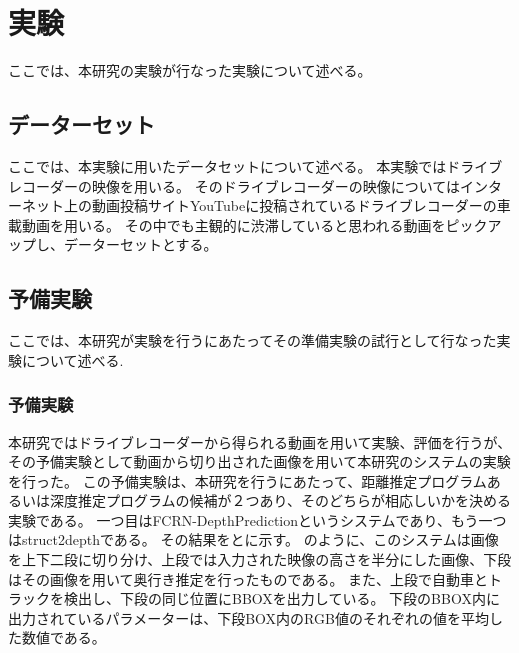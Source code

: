 \chapter{実験}
ここでは、本研究の実験が行なった実験について述べる。

\section{データーセット}
ここでは、本実験に用いたデータセットについて述べる。
本実験ではドライブレコーダーの映像を用いる。
そのドライブレコーダーの映像についてはインターネット上の動画投稿サイトYouTubeに投稿されているドライブレコーダーの車載動画を用いる。
その中でも主観的に渋滞していると思われる動画をピックアップし、データーセットとする。

\section{予備実験}
ここでは、本研究が実験を行うにあたってその準備実験の試行として行なった実験について述べる.



\subsection{予備実験}
本研究ではドライブレコーダーから得られる動画を用いて実験、評価を行うが、その予備実験として動画から切り出された画像を用いて本研究のシステムの実験を行った。
この予備実験は、本研究を行うにあたって、距離推定プログラムあるいは深度推定プログラムの候補が２つあり、そのどちらが相応しいかを決める実験である。
一つ目はFCRN-DepthPrediction\cite{laina2016deeper}というシステムであり、もう一つはstruct2depthである。
その結果をとに示す。
のように、このシステムは画像を上下二段に切り分け、上段では入力された映像の高さを半分にした画像、下段はその画像を用いて奥行き推定を行ったものである。
また、上段で自動車とトラックを検出し、下段の同じ位置にBBOXを出力している。
下段のBBOX内に出力されているパラメーターは、下段BOX内のRGB値のそれぞれの値を平均した数値である。

